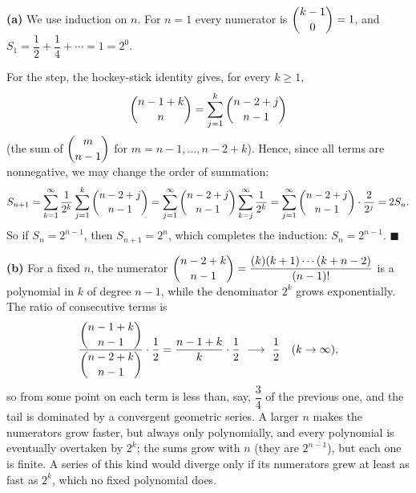 \textbf{(a)} We use induction on $n$. For $n=1$ every numerator is $\dbinom{k-1}{0}=1$, and $S_1=\dfrac12+\dfrac14+\cdots=1=2^0$.

For the step, the hockey-stick identity gives, for every $k\ge1$,
\[\dbinom{n-1+k}{n}=\sum_{j=1}^{k}\dbinom{n-2+j}{n-1}\]
(the sum of $\dbinom{m}{n-1}$ for $m=n-1,\dots,n-2+k$). Hence, since all terms are nonnegative, we may change the order of summation:
\[S_{n+1}=\sum_{k=1}^{\infty}\dfrac{1}{2^k}\sum_{j=1}^{k}\dbinom{n-2+j}{n-1}=\sum_{j=1}^{\infty}\dbinom{n-2+j}{n-1}\sum_{k=j}^{\infty}\dfrac{1}{2^k}=\sum_{j=1}^{\infty}\dbinom{n-2+j}{n-1}\cdot\dfrac{2}{2^j}=2S_n.\]
So if $S_n=2^{n-1}$, then $S_{n+1}=2^n$, which completes the induction: $\boxed{S_n=2^{n-1}}$. $\blacksquare$

\textbf{(b)} For a fixed $n$, the numerator $\dbinom{n-2+k}{n-1}=\dfrac{(k)(k+1)\cdots(k+n-2)}{(n-1)!}$ is a polynomial in $k$ of degree $n-1$, while the denominator $2^k$ grows exponentially. The ratio of consecutive terms is
\[\dfrac{\dbinom{n-1+k}{n-1}}{\dbinom{n-2+k}{n-1}}\cdot\dfrac12=\dfrac{n-1+k}{k}\cdot\dfrac12\ \longrightarrow\ \dfrac12\quad(k\to\infty),\]
so from some point on each term is less than, say, $\dfrac34$ of the previous one, and the tail is dominated by a convergent geometric series. A larger $n$ makes the numerators grow faster, but always only polynomially, and every polynomial is eventually overtaken by $2^k$; the sums grow with $n$ (they are $2^{n-1}$), but each one is finite. A series of this kind would diverge only if its numerators grew at least as fast as $2^k$, which no fixed polynomial does.
